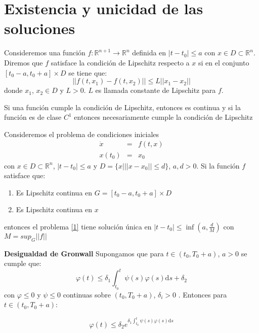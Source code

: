 \section{Existencia y unicidad de las soluciones}

\begin{definicion}
Consideremos una función $f:\mathbb{R}^{n+1}\longrightarrow\mathbb{R}^n$ definida en $|t-t_0|\leq a$ con $x\in D\subset\mathbb{R}^n$. Diremos que $f$ satisface la condición de Lipschitz respecto a $x$ si en el conjunto $\left[t_0-a,t_0+a\right]\times D$ se tiene que:
$$
||f(t,x_1)-f(t,x_2) ||\leq L ||x_1-x_2||
$$
donde $x_1$, $x_2\in D$ y $L>0$. $L$ es llamada constante de Lipschitz para $f$.
\end{definicion}

\begin{obs}
Si una función cumple la condición de Lipschitz, entonces es continua y si la función es de clase $C^1$ entonces necesariamente cumple la condición de Lipschitz
\end{obs}

\begin{teorema}
Consideremos el problema de condiciones iniciales
\begin{eqnarray}
\dot{x}&=&f(t,x)\nonumber\\
x(t_0)&=&x_0\label{1}
\end{eqnarray}
con $x\in D\subset\mathbb{R}^n$, $|t-t_0|\leq a$ y $D=\{x | ||x-x_0||\leq d\}$, $a,d>0$. Si la función $f$ satisface que:
\begin{enumerate}
    \item Es Lipschitz continua en $G=[t_0-a,t_0+a]\times D$
    \item Es Lipschitz continua en $x$
\end{enumerate}
entonces el problema \ref{1} tiene solución única en $|t-t_0|\leq \inf (a,\frac{d}{M})$ con $M=sup_{G} ||f||$

\end{teorema}

\begin{teorema}{\bf Desigualdad de Gronwall}
Supongamos que para $t\in(t_0,T_0+a)$, $a>0$ se cumple que:
$$
\varphi(t)\leq \delta_1\int_{t_0}^{t}\psi(s)\varphi(s)\mathrm{d}s +\delta_2
$$
con $\varphi\leq 0$ y $\psi\leq 0$ continuas sobre $(t_0,T_0+a)$, $\delta_i >0$ . Entonces para $t\in (t_0,T_0+a)$:

$$
\varphi(t)\leq \delta_2e^{\delta_1\int_{t_0}^{t}\psi(s)\varphi(s)\mathrm{d}s}
$$

\end{teorema}

